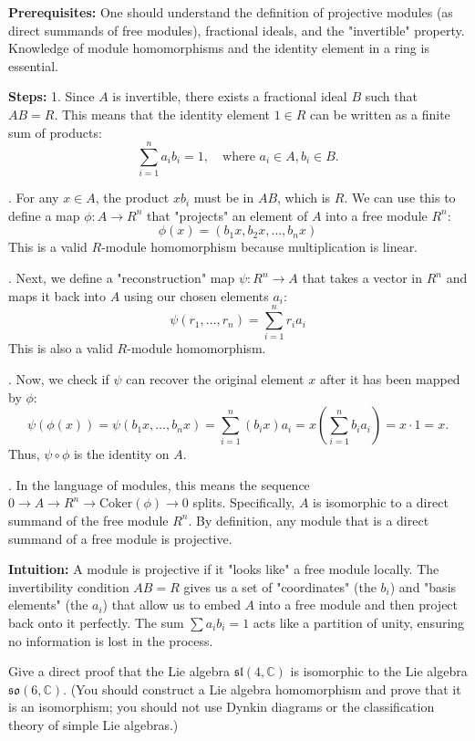 \begin{solution}
\textbf{Prerequisites:}
One should understand the definition of projective modules (as direct summands of free modules), fractional ideals, and the "invertible" property. Knowledge of module homomorphisms and the identity element in a ring is essential.

\medskip
\textbf{Steps:}
1. Since $A$ is invertible, there exists a fractional ideal $B$ such that $AB = R$. This means that the identity element $1 \in R$ can be written as a finite sum of products:
$$\sum_{i=1}^n a_i b_i = 1, \quad \text{where } a_i \in A, b_i \in B.$$

. For any $x \in A$, the product $x b_i$ must be in $AB$, which is $R$. We can use this to define a map $\phi: A \to R^n$ that "projects" an element of $A$ into a free module $R^n$:
$$\phi(x) = (b_1 x, b_2 x, \dots, b_n x)$$
This is a valid $R$-module homomorphism because multiplication is linear.

. Next, we define a "reconstruction" map $\psi: R^n \to A$ that takes a vector in $R^n$ and maps it back into $A$ using our chosen elements $a_i$:
$$\psi(r_1, \dots, r_n) = \sum_{i=1}^n r_i a_i$$
This is also a valid $R$-module homomorphism.

. Now, we check if $\psi$ can recover the original element $x$ after it has been mapped by $\phi$:
$$\psi(\phi(x)) = \psi(b_1 x, \dots, b_n x) = \sum_{i=1}^n (b_i x) a_i = x \left(\sum_{i=1}^n b_i a_i\right) = x \cdot 1 = x.$$
Thus, $\psi \circ \phi$ is the identity on $A$.

. In the language of modules, this means the sequence $0 \to A \to R^n \to \text{Coker}(\phi) \to 0$ splits. Specifically, $A$ is isomorphic to a direct summand of the free module $R^n$. By definition, any module that is a direct summand of a free module is projective.

\medskip
\textbf{Intuition:}
A module is projective if it "looks like" a free module locally. The invertibility condition $AB=R$ gives us a set of "coordinates" (the $b_i$) and "basis elements" (the $a_i$) that allow us to embed $A$ into a free module and then project back onto it perfectly. The sum $\sum a_i b_i = 1$ acts like a partition of unity, ensuring no information is lost in the process.
\end{solution}

\begin{exercise}
\label{algebra:2022:3}
Give a direct proof that the Lie algebra $\mathfrak{sl}(4, \mathbb{C})$ is isomorphic to the Lie algebra $\mathfrak{so}(6, \mathbb{C})$. (You should construct a Lie algebra homomorphism and prove that it is an isomorphism; you should not use Dynkin diagrams or the classification theory of simple Lie algebras.)
\end{exercise}

